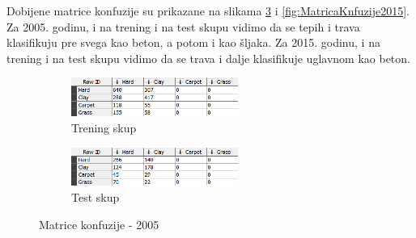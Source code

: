 \documentclass[a4paper]{article}
\begin{document}
Dobijene matrice konfuzije su prikazane na slikama \ref{fig:MatricaKnfuzije2005} i \ref{fig:MatricaKnfuzije2015}.
Za 2005. godinu, i na trening i na test skupu vidimo da se tepih i trava klasifikuju pre svega kao beton, a potom i kao šljaka.
Za 2015. godinu, i na trening i na test skupu vidimo da se trava i dalje klasifikuje uglavnom kao beton.

\begin{figure}[H]
	\begin{subfigure}[h]{\textwidth}
		\begin{center}
			\includegraphics[width=0.6\textwidth]{Klasifikacija/DrvoOdlucivanja/2005/MatricaKonfuzijeTrening.png}
		\end{center}
		\caption{Trening skup}
		\label{fig:MatricaKnfuzijeTrening2005}
	\end{subfigure}

	\vspace{0.5cm}
	\begin{subfigure}[h]{\textwidth}
		\begin{center}
			\includegraphics[width=0.6\textwidth]{Klasifikacija/DrvoOdlucivanja/2005/MatricaKonfuzijeTest.png}
		\end{center}
		\caption{Test skup}
		\label{fig:MatricaKnfuzijeTest2005}
	\end{subfigure}
	\caption{Matrice konfuzije - 2005}
	\label{fig:MatricaKnfuzije2005}
\end{figure}
\end{document}
